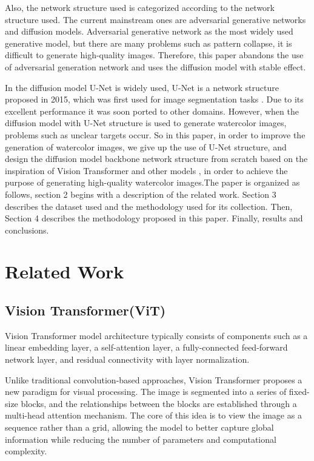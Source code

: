 \documentclass{acsman}
\begin{document}
Also, the network structure used is categorized according to the network structure used. The current mainstream ones are adversarial generative networks and diffusion models. Adversarial generative network \cite{goodfellow2020generative} as the most widely used generative model, but there are many problems such as pattern collapse, it is difficult to generate high-quality images. Therefore, this paper abandons the use of adversarial generation network and uses the diffusion model with stable effect.

In the diffusion model U-Net is widely used, U-Net is a network structure proposed in 2015, which was first used for image segmentation tasks \cite{ho2020denoising}\cite{ronneberger2015u}\cite{rombach2022high}. Due to its excellent performance it was soon ported to other domains. However, when the diffusion model with U-Net structure is used to generate watercolor images, problems such as unclear targets occur. So in this paper, in order to improve the generation of watercolor images, we give up the use of U-Net structure, and design the diffusion model backbone network structure from scratch based on the inspiration of Vision Transformer and other models \cite{dosovitskiy2020image}, in order to achieve the purpose of generating high-quality watercolor images.The paper is organized as follows, section 2 begins with a description of the related work. Section 3 describes the dataset used and the methodology used for its collection. Then, Section 4 describes the methodology proposed in this paper. Finally,  results and conclusions.

\section{Related Work}\label{sec:related work}
\subsection{Vision Transformer(ViT)}
Vision Transformer model \cite{dosovitskiy2020image} architecture typically consists of components such as a linear embedding layer, a self-attention layer, a fully-connected feed-forward network layer, and residual connectivity with layer normalization.

Unlike traditional convolution-based approaches, Vision Transformer proposes a new paradigm for visual processing. The image is segmented into a series of fixed-size blocks, and the relationships between the blocks are established through a multi-head attention mechanism. The core of this idea is to view the image as a sequence rather than a grid, allowing the model to better capture global information while reducing the number of parameters and computational complexity.
\end{document}
